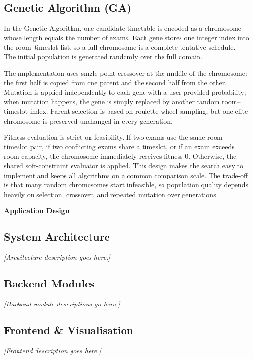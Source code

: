 \subsection{Genetic Algorithm (GA)}

In the Genetic Algorithm, one candidate timetable is encoded as a
chromosome whose length equals the number of exams. Each gene stores one
integer index into the room--timeslot list, so a full chromosome is a
complete tentative schedule. The initial population is generated
randomly over the full domain.

The implementation uses single-point crossover at the middle of the
chromosome: the first half is copied from one parent and the second half
from the other. Mutation is applied independently to each gene with a
user-provided probability; when mutation happens, the gene is simply
replaced by another random room--timeslot index. Parent selection is
based on roulette-wheel sampling, but one elite chromosome is preserved
unchanged in every generation.

Fitness evaluation is strict on feasibility. If two exams use the same
room--timeslot pair, if two conflicting exams share a timeslot, or if an
exam exceeds room capacity, the chromosome immediately receives fitness
$0$. Otherwise, the shared soft-constraint evaluator is applied. This
design makes the search easy to implement and keeps all algorithms on a
common comparison scale. The trade-off is that many random chromosomes
start infeasible, so population quality depends heavily on selection,
crossover, and repeated mutation over generations.

\newpage
{}
{}
{\large\bfseries Application Design}
\vspace{2pt}
\titlerule
\vspace{6pt}

\subsection{System Architecture}
\noindent\textit{[Architecture description goes here.]}

\subsection{Backend Modules}
\noindent\textit{[Backend module descriptions go here.]}

\subsection{Frontend \& Visualisation}
\noindent\textit{[Frontend description goes here.]}

